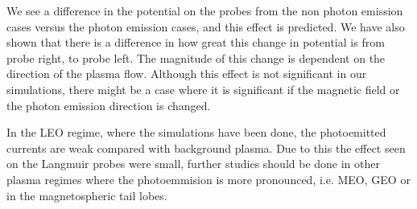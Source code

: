
We see a difference in the potential on the probes from the non photon emission cases versus
the photon emission cases, and this effect is predicted. We have also shown that there
is a difference in how great this change in potential is from probe right, to probe left.
The magnitude of this change is dependent on the direction of the plasma flow. Although this effect
is not significant in our simulations, there might be a case where it is significant if
the magnetic field or the photon emission direction is changed.

In the LEO regime, where the simulations have been done, the photoemitted currents are weak compared with
background plasma. Due to this the effect seen on the Langmuir probes were small, further studies should be done
in other plasma regimes where the photoemmision is more pronounced, i.e. MEO, GEO or in the magnetospheric tail lobes.
